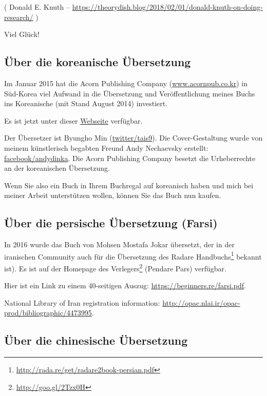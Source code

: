 
( Donald E. Knuth -- \url{https://theorydish.blog/2018/02/01/donald-knuth-on-doing-research/} )

Viel Glück!

\subsection*{Über die koreanische Übersetzung}

Im Januar 2015 hat die Acorn Publishing Company (\href{http://www.acornpub.co.kr}{www.acornpub.co.kr}) in Süd-Korea
viel Aufwand in die Übersetzung und Veröffentlichung meines Buchs ins Koreanische (mit Stand August 2014) investiert.

Es ist jetzt unter dieser \href{http://go.yurichev.com/17343}{Webseite} verfügbar.

Der Übersetzer ist Byungho Min (\href{http://go.yurichev.com/17344}{twitter/tais9}).
Die Cover-Gestaltung wurde von meinem künstlerisch begabten Freund Andy Nechaevsky erstellt:
\href{http://go.yurichev.com/17023}{facebook/andydinka}.
Die Acorn Publishing Company besetzt die Urheberrechte an der koreanischen Übersetzung.

Wenn Sie also ein  Buch in Ihrem Buchregal auf koreanisch haben und 
mich bei meiner Arbeit unterstützen wollen, können Sie das Buch nun kaufen.

\subsection*{Über die persische Übersetzung (Farsi)}

In 2016 wurde das Buch von Mohsen Mostafa Jokar übersetzt, der in der iranischen Community
auch für die Übersetzung des Radare
Handbuchs\footnote{\url{http://rada.re/get/radare2book-persian.pdf}} bekannt ist).
Es ist auf der Homepage des Verlegers\footnote{\url{http://goo.gl/2Tzx0H}} (Pendare Pars)
verfügbar.

Hier ist ein Link zu einem 40-seitigen Auszug: \url{https://beginners.re/farsi.pdf}.

National Library of Iran registration information: \url{http://opac.nlai.ir/opac-prod/bibliographic/4473995}.

\subsection*{Über die chinesische Übersetzung}


